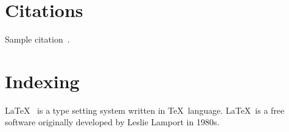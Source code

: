 \section{Citations}\label{sec:citations}
Sample citation~\cite{lamport1994latex}.

\section{Indexing}\label{sec:indexing} \LaTeX\  is a 
type setting system written in \TeX\ language. \LaTeX\ 
is a free software originally developed by 
Leslie Lamport in 1980s. 



